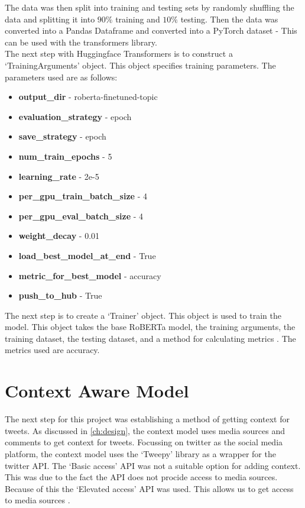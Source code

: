 The data was then split into training and testing sets by randomly shuffling the data and splitting it into $90\%$ training and $10\%$ testing.
Then the data was converted into a Pandas Dataframe and converted into a PyTorch dataset - This can be used with the transformers library.\\
The next step with Huggingface Transformers is to construct a `TrainingArguments' object. This object specifies training parameters. The parameters
used are as follows:
\begin{itemize}
    \item \textbf{output\_dir} - roberta-finetuned-topic
    \item \textbf{evaluation\_strategy} - epoch
    \item \textbf{save\_strategy} - epoch
    \item \textbf{num\_train\_epochs} - 5
    \item \textbf{learning\_rate} - 2e-5
    \item \textbf{per\_gpu\_train\_batch\_size} - 4
    \item \textbf{per\_gpu\_eval\_batch\_size} - 4
    \item \textbf{weight\_decay} - 0.01
    \item \textbf{load\_best\_model\_at\_end} - True
    \item \textbf{metric\_for\_best\_model} - accuracy
    \item \textbf{push\_to\_hub} - True
\end{itemize}

The next step is to create a `Trainer' object. This object is used to train the model. This object takes the base RoBERTa model, the training arguments,
the training dataset, the testing dataset, and a method for calculating metrics \cite{huggingface}. The metrics used are accuracy. 
\section{Context Aware Model}\label{sec:context_aware_model}
The next step for this project was establishing a method of getting context for tweets. As discussed in \cref{ch:design}, the context model uses
media sources and comments to get context for tweets. Focussing on twitter as the social media platform, the context model uses the `Tweepy' library
as a wrapper for the twitter API. The `Basic access' API was not a suitable option for adding context. This was due to the fact the API does not
procide access to media sources. Because of this the `Elevated access' API was used. This allows us to get access to media sources \cite{twitter_developer_nodate}.
